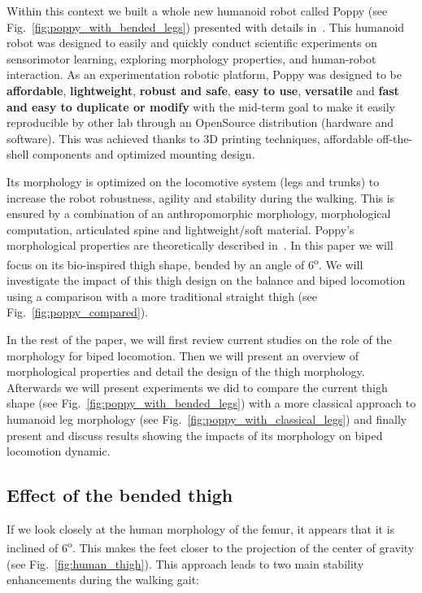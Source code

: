 Within this context we built a whole new humanoid robot called Poppy (see Fig.~\ref{fig:poppy_with_bended_legs}) presented with details in~\cite{lapeyre2013poppy}. This humanoid robot was designed to easily and quickly conduct scientific experiments on sensorimotor learning, exploring morphology properties, and human-robot interaction. As an experimentation robotic platform, Poppy was designed to be \textbf{affordable}, \textbf{lightweight}, \textbf{robust and safe}, \textbf{easy to use}, \textbf{versatile} and \textbf{fast and easy to duplicate or modify} with the mid-term goal to make it easily reproducible by other lab through an OpenSource distribution (hardware and software). This was achieved thanks to 3D printing techniques, affordable off-the-shell components and optimized mounting design.

Its morphology is optimized on the locomotive system (legs and trunks) to increase the robot robustness, agility and stability during the walking. This is ensured by a combination of an anthropomorphic morphology, morphological computation, articulated spine and lightweight/soft material. Poppy's morphological properties are theoretically described in~\cite{lapeyre2013poppy}. In this paper we will focus on its bio-inspired thigh shape, bended by an angle of 6\textsuperscript{o}. We will investigate the impact of this thigh design on the balance and biped locomotion using a comparison with a more traditional straight thigh (see Fig.~\ref{fig:poppy_compared}).

In the rest of the paper, we will first review current studies on the role of the morphology for biped locomotion. Then we will present an overview of morphological properties and detail the design of the thigh morphology. Afterwards we will present experiments we did to compare the current thigh shape (see Fig.~\ref{fig:poppy_with_bended_legs}) with a more classical approach to humanoid leg morphology (see Fig.~\ref{fig:poppy_with_classical_legs}) and finally present and discuss results showing the impacts of its morphology on biped locomotion dynamic.

\subsection{Effect of the bended thigh} %
\label{sub:effect_of_the_bended_thigh}
If we look closely at the human morphology of the femur, it appears that it is inclined of
6\textsuperscript{o}. This makes the feet closer to the projection of the center of gravity (see
Fig.~\ref{fig:human_thigh}). This approach leads to two main stability enhancements during the
walking gait:

